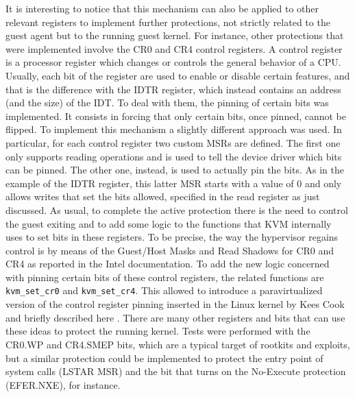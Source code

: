 It is interesting to notice that this mechanism can also be applied to other relevant registers to implement further protections, not strictly related to the guest agent but to the running guest kernel. For instance, other protections that were implemented involve the CR0 and CR4 control registers. A control register is a processor register which changes or controls the general behavior of a CPU. Usually, each bit of the register are used to enable or disable certain features, and that is the difference with the IDTR register, which instead contains an address (and the size) of the IDT. To deal with them, the pinning of certain bits was implemented. It consists in forcing that only certain bits, once pinned, cannot be flipped. To implement this mechanism a slightly different approach was used. In particular, for each control register two custom MSRs are defined. The first one only supports reading operations and is used to tell the device driver which bits can be pinned. The other one, instead, is used to actually pin the bits. As in the example of the IDTR register, this latter MSR starts with a value of 0 and only allows writes that set the bits allowed, specified in the read register as just discussed. As usual, to complete the active protection there is the need to control the guest exiting and to add some logic to the functions that KVM internally uses to set bits in these registers. To be precise, the way the hypervisor regains control is by means of the Guest/Host Masks and Read Shadows for CR0 and CR4 as reported in the Intel documentation. To add the new logic concerned with pinning certain bits of these control registers, the related functions are \texttt{kvm\_set\_cr0} and \texttt{kvm\_set\_cr4}. This allowed to introduce a paravirtualized version of the control register pinning inserted in the Linux kernel by Kees Cook and briefly described here \cite{kees-cook}. There are many other registers and bits that can use these ideas to protect the running kernel. Tests were performed with the CR0.WP and CR4.SMEP bits, which are a typical target of rootkits and exploits, but a similar protection could be implemented to protect the entry point of system calls (LSTAR MSR) and the bit that turns on the No-Execute protection (EFER.NXE), for instance.

